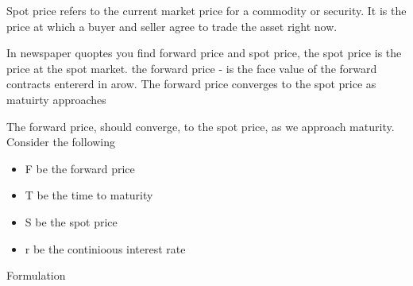 \documentclass{article}
\theoremstyle{mytheoremstyle}
\theoremstyle{mytheoremstyle}
\theoremstyle{myproblemstyle}
\begin{document}
\begin{definition}[Spotting]
	Spot price refers to the current market price for a commodity or security. It is the price at which a buyer and seller agree to trade the asset right now.
\end{definition}

In newspaper quoptes you find forward price and spot price, the spot price is the price at the spot market.
the forward price - is the face value of the forward contracts entererd in  arow.
The forward price converges to the spot price as matuirty approaches

The forward price, should converge, to the spot price, as we approach maturity.
Consider the following

\begin{itemize}

	\item F be the forward price
	\item T be the time to maturity
	\item S be the spot price
	\item r be the continioous interest rate
\end{itemize}


Formulation \\
\end{document}
